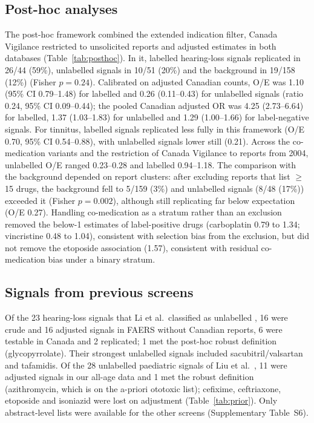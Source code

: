 \documentclass[11pt]{article}
\begin{document}
\subsection{Post-hoc analyses}
The post-hoc framework combined the extended indication filter, Canada Vigilance restricted to unsolicited reports and
adjusted estimates in both databases (Table~\ref{tab:posthoc}). In it, labelled hearing-loss signals replicated in
26/44 (59\%), unlabelled signals in 10/51 (20\%) and the background in 19/158 (12\%)
(Fisher $p=0.24$). Calibrated on adjusted Canadian counts, O/E was 1.10 (95\% CI
0.79--1.48) for labelled and
0.26 (0.11--0.43)
for unlabelled signals (ratio 0.24, 95\% CI
0.09--0.44); the pooled
Canadian adjusted OR was 4.25 (2.73--6.64)
for labelled, 1.37 (1.03--1.83)
for unlabelled and 1.29 (1.00--1.66)
for label-negative signals. For tinnitus, labelled signals replicated less fully in this framework (O/E
0.70, 95\% CI 0.54--0.88),
with unlabelled signals lower still (0.21). Across the co-medication variants and the restriction of Canada Vigilance to reports from 2004,
unlabelled O/E ranged 0.23--0.28 and labelled
0.94--1.18. The comparison with the background depended on
report clusters: after excluding reports that list $\geq$15 drugs, the background fell to 5/159 (3\%) and
unlabelled signals (8/48 (17\%)) exceeded it (Fisher $p=0.002$),
although still replicating far below expectation (O/E 0.27). Handling
co-medication as a stratum rather than an exclusion removed the below-1 estimates of label-positive drugs (carboplatin
0.79 to 1.34; vincristine
0.48 to 1.04), consistent
with selection bias from the exclusion, but did not remove the etoposide association
(1.57), consistent with residual co-medication bias under a binary stratum.

\subsection{Signals from previous screens}
Of the 23 hearing-loss signals that Li et al.\ classified as unlabelled \cite{li2024},
16 were crude and 16 adjusted signals in FAERS without Canadian reports,
6 were testable in Canada and 2 replicated; 1
met the post-hoc robust definition (glycopyrrolate). Their strongest unlabelled signals included
sacubitril/valsartan and tafamidis. Of the 28 unlabelled paediatric signals of Liu et al.\ \cite{liu2025},
11 were adjusted signals in our all-age data and 1 met the robust definition
(azithromycin, which is on the a-priori ototoxic list);
cefixime, ceftriaxone, etoposide and isoniazid were lost on adjustment (Table~\ref{tab:prior}). Only
abstract-level lists were available for the other screens (Supplementary Table~S6).
\end{document}
